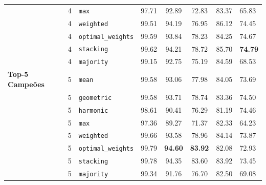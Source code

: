 \begin{table}[t]
\begin{tabular}{l c l c c c c}
 & 4 & \texttt{max} & 97.71 & 92.89 & 72.83 & 83.37 & 65.83 \\
 & 4 & \texttt{weighted} & 99.51 & 94.19 & 76.95 & 86.12 & 74.45 \\
 & 4 & \texttt{optimal_weights} & 99.59 & 93.84 & 78.23 & 84.25 & 74.67 \\
 & 4 & \texttt{stacking} & 99.62 & 94.21 & 78.72 & 85.70 & \textbf{74.79} \\
 & 4 & \texttt{majority} & 99.15 & 92.75 & 75.19 & 84.59 & 68.53 \\
\midrule
\textbf{Top-5 Campeões} & 5 & \texttt{mean} & 99.58 & 93.06 & 77.98 & 84.05 & 73.69 \\
 & 5 & \texttt{geometric} & 99.58 & 93.71 & 78.74 & 83.36 & 74.50 \\
 & 5 & \texttt{harmonic} & 98.61 & 90.41 & 76.29 & 81.19 & 74.46 \\
 & 5 & \texttt{max} & 97.36 & 89.27 & 71.37 & 82.33 & 64.23 \\
 & 5 & \texttt{weighted} & 99.66 & 93.58 & 78.96 & 84.14 & 73.87 \\
 & 5 & \texttt{optimal_weights} & 99.79 & \textbf{94.60} & \textbf{83.92} & 82.08 & 72.93 \\
 & 5 & \texttt{stacking} & 99.78 & 94.35 & 83.60 & 83.92 & 73.45 \\
 & 5 & \texttt{majority} & 99.34 & 91.76 & 76.70 & 82.50 & 69.08 \\
\bottomrule
\end{tabular}
\end{table}